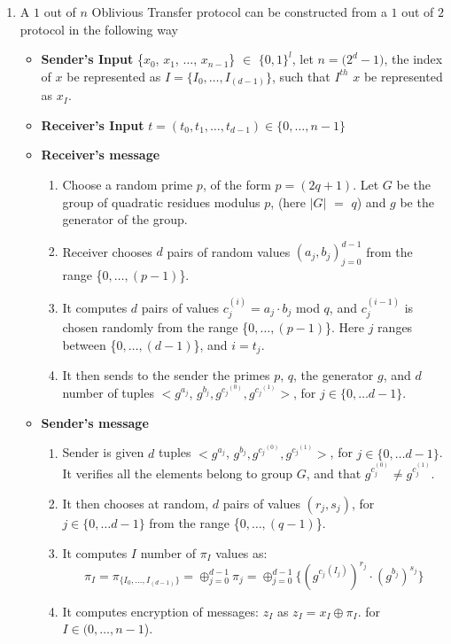\documentclass{article}
\begin{document}
\begin{enumerate}
\item A $1$ out of $n$ Oblivious Transfer protocol can be constructed from a $1$ out of $2$ protocol in the following way

\begin{itemize}
\item \textbf{Sender's Input} \{$x_0$, $x_1$, $\ldots$, $x_{n-1}$\} $\in$ $\{0, 1\}^{l}$, let $n = {(2^{d} - 1})$, the index of $x$ be represented as $I = \{I_0, \ldots, I_{(d-1)}\}$, such that $I^{th}$ $x$ be represented as $x_I$.

\item \textbf{Receiver's Input} $t = (t_0, t_1, \ldots, t_{d-1}) \in \{0,\ldots, {n-1}\}$

\item \textbf{Receiver's message}
\begin{enumerate}
\item Choose a random prime $p$, of the form $p = (2q + 1)$. Let $G$ be the group of quadratic residues modulus $p$, (here $|G|$ $=$ $q$) and $g$ be the generator of the group. 
\item Receiver chooses $d$ pairs of random values $(a_j, b_j)_{j=0}^{d-1}$ from the range \{$0,\ldots, (p-1)$\}. 
\item It computes $d$ pairs of values $c_{j}^{(i)} = {a_j}\cdot {b_j}$ mod $q$, and $c_{j}^{(i - 1)}$ is chosen randomly from the range \{$0, \ldots, (p-1)$\}. Here $j$ ranges between \{$0, \ldots, (d-1)$\}, and $i = t_j$.

\item It then sends to the sender the primes $p$, $q$, the generator $g$, and $d$ number of tuples $<g^{a_j}$, $g^{b_j}, g^{{c_j}^{(0)}}, g^{{c_j}^{(1)}}>$, for $j \in \{0, \ldots {d-1}\}$.
\end{enumerate}

\item \textbf{Sender's message}
\begin{enumerate}
\item Sender is given $d$ tuples $<g^{a_j}$, $g^{b_j}, g^{{c_j}^{(0)}}, g^{{c_j}^{(1)}}>$, for $j \in \{0, \ldots {d-1}\}$. It verifies all the elements belong to group $G$, and that $g^{c_{j}^{(0)}} \neq g^{c_{j}^{(1)}}$. 

\item It then chooses at random, $d$ pairs of values $(r_j, s_j)$, for $j \in \{0, \ldots {d-1}\}$ from the range \{$0, \ldots, (q-1)$\}.
\item It computes $I$ number of ${\pi}_{I}$ values as: 
\begin{equation}
\pi_{I} = {\pi}_{\{I_0, \ldots, I_{(d-1)}\}} = \oplus_{j=0}^{d-1} {\pi}_{j} = \oplus_{j=0}^{d-1} \{{({g^{c_j}}^{(I_j)})}^{r_j} \cdot {(g^{b_j})}^{s_j}\}
\end{equation}
\item It computes encryption of messages: $z_{I}$ as $z_I = x_I \oplus {\pi_I}$.
for $I \in (0, \ldots, n - 1$).


\end{enumerate}
\end{itemize}
\end{enumerate}
\end{document}
